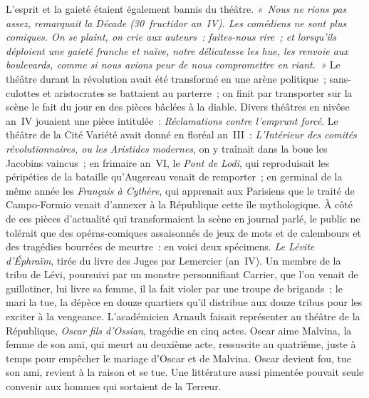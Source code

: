 \documentclass[french,twoside]{book} %
\begin{document}
L’esprit et la gaieté étaient également bannis du théâtre. \emph{« Nous ne rions pas assez, remarquait la \emph{Décade} (30 fructidor an IV). Les comédiens ne sont plus comiques. On se plaint, on crie aux auteurs : {\itshape faites-nous rire} ; et lorsqu’ils déploient une gaieté franche et naïve, notre délicatesse les hue, les renvoie aux boulevards, comme si nous avions peur de nous compromettre en riant. »} Le théâtre durant la révolution avait été transformé en une arène politique ; sans-culottes et aristocrates se battaient au parterre ; on finit par transporter sur la scène le fait du jour en des pièces bâclées à la diable. Divers théâtres en nivôse an IV jouaient une pièce intitulée : \emph{Réclamations contre l’emprunt forcé}. Le théâtre de la Cité Variété avait donné en floréal an III :  
\label{p590}\emph{L’Intérieur des comités révolutionnaires, ou les Aristides modernes}, on y traînait dans la boue les Jacobins vaincus ; en frimaire an VI, le \emph{Pont de Lodi}, qui reproduisait les péripéties de la bataille qu’Augereau venait de remporter ; en germinal de la même année les \emph{Français à Cythère}, qui apprenait aux Parisiens que le traité de Campo-Formio venait d’annexer à la République cette île mythologique. À côté de ces pièces d’actualité qui transformaient la scène en journal parlé, le public ne tolérait que des opéras-comiques assaisonnés de jeux de mots et de calembours et des tragédies bourrées de meurtre : en voici deux spécimens. \emph{Le Lévite d’Éphraïm}, tirée du livre des Juges par Lemercier (an IV). Un membre de la tribu de Lévi, poursuivi par un monstre personnifiant Carrier, que l’on venait de guillotiner, lui livre sa femme, il la fait violer par une troupe de brigands ; le mari la tue, la dépèce en douze quartiers qu’il distribue aux douze tribus pour les exciter à la vengeance. L’académicien Arnault faisait représenter au théâtre de la République, \emph{Oscar fils d’Ossian}, tragédie en cinq actes. Oscar aime Malvina, la femme de son ami, qui meurt au deuxième acte, ressuscite au quatrième, juste à temps pour empêcher le mariage d’Oscar et de Malvina. Oscar devient fou, tue son ami, revient à la raison et se tue. Une littérature aussi pimentée pouvait seule convenir aux hommes qui sortaient de la Terreur.\par
\end{document}
